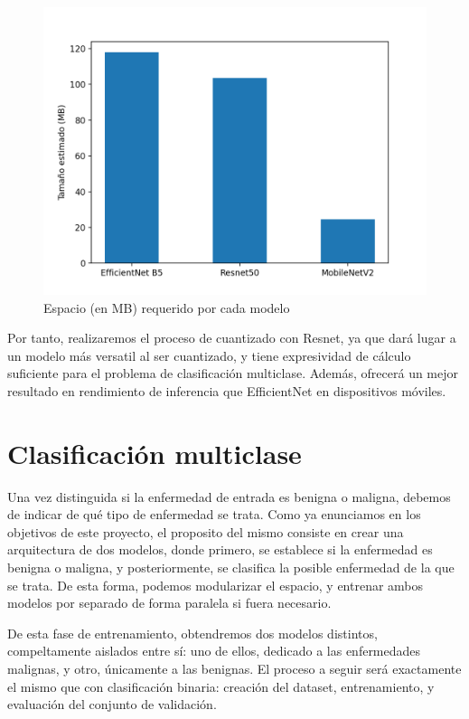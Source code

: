 \begin{figure}[H]
	\centering
	\includegraphics[scale = 0.6]{imagenes/tamestimado.png}
	\caption{Espacio (en MB) requerido por cada modelo}
	\label {fig:tam}
\end{figure}

Por tanto, realizaremos el proceso de cuantizado con Resnet, ya que dará lugar a un modelo más versatil al ser cuantizado, y tiene expresividad de cálculo suficiente para el problema de clasificación multiclase. Además, ofrecerá un mejor resultado en rendimiento de inferencia que EfficientNet en dispositivos móviles.


\section {Clasificación multiclase}

Una vez distinguida si la enfermedad de entrada es benigna o maligna, debemos de indicar de qué tipo de enfermedad se trata.  Como ya enunciamos en los objetivos de este proyecto, el proposito  del mismo consiste en crear una arquitectura de dos modelos, donde primero, se establece si la enfermedad es benigna o maligna, y posteriormente, se clasifica la posible enfermedad de la que se trata. De esta forma, podemos modularizar el espacio, y entrenar ambos modelos por separado de forma paralela si fuera necesario.

De esta fase de entrenamiento, obtendremos dos modelos distintos, compeltamente aislados entre sí: uno de ellos, dedicado a las enfermedades malignas, y otro, únicamente a las benignas. El proceso a seguir será exactamente el mismo que con clasificación binaria: creación del dataset, entrenamiento, y evaluación del conjunto de validación.

